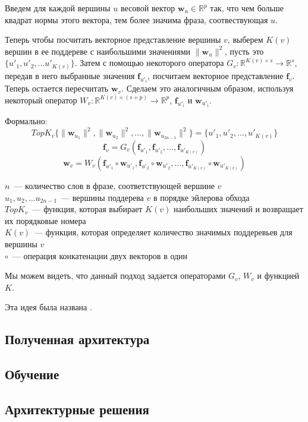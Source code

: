 Введем для каждой вершины $u$ весовой вектор $\pmb{w}_u \in \mathbb{R}^p$  так, что
чем больше квадрат нормы  этого вектора, тем более значима фраза, соотвествующая $u$.

Теперь чтобы посчитать векторное представление вершины $v$, выберем $K(v)$ вершин
в ее поддереве с наибольшими значениями $\lVert \pmb{w}_u \rVert^2$, пусть это $\{ u'_1, u'_2, \dots u'_{K(v)} \}$.
Затем с помощью некоторого оператора $G_v:\mathbb{R}^{K(v) \times s} \to \mathbb{R}^s$, 
передав в него выбранные значения $\pmb{f}_{u'_i}$, посчитаем векторное представление $\pmb{f}_v$.
Теперь остается пересчитать $\pmb{w}_v$. Сделаем это аналогичным образом, используя некоторый оператор 
$W_v :\mathbb{R}^{K(v) \times (s + p)} \to \mathbb{R}^p$, $\pmb{f}_{u'_i}$ и $\pmb{w}_{u'_i}$.

Формально:
$$TopK_v \{ \lVert \pmb{w}_{u_1} \rVert^2, \lVert \pmb{w}_{u_2} \rVert^2, \dots, \lVert \pmb{w}_{u_{2n-1}} \rVert^2\} = \{u'_1, u'_2, \dots, u'_{K(v)}\}$$
$$\pmb{f}_v = G_v(\pmb{f}_{u'_1}, \pmb{f}_{u'_2}, \dots, \pmb{f}_{u'_{K(v)}})$$
$$\pmb{w}_v = W_v(\pmb{f}_{u'_1} \circ \pmb{w}_{u'_1},\pmb{f}_{u'_2} \circ \pmb{w}_{u'_2}, \dots, \pmb{f}_{u'_{K(v)}} \circ \pmb{w}_{u'_{K(v)}})$$

\noindent $n$~--- количество слов в фразе, соответствующей вершине $v$\\
$u_1, u_2, \dots u_{2n-1}$~--- вершины поддерева $v$ в порядке эйлерова обхода\\
$TopK_v$~--- функция, которая выбирает $K(v)$ наибольших значений и возвращает их порядковые номера\\
$K(v)$~--- функция, которая определяет количество значимых поддеревьев для вершины $v$\\
$\circ$~--- операция конкатенации двух векторов в один

Мы можем видеть, что данный подход задается операторами $G_v$, $W_v$ и функцией $K$.


\noindent Эта идея была названа .

\subsection{Полученная архитектура}

\subsection{Обучение}

\subsection{Архитектурные решения}
 